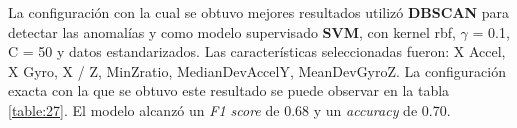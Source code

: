 	La configuración con la cual se obtuvo mejores resultados utilizó \textbf{DBSCAN} para detectar las anomalías y como modelo
	supervisado \textbf{SVM}, con kernel rbf, $\gamma$ = 0.1, C = 50  y datos estandarizados. Las características seleccionadas fueron: 
	X Accel, X Gyro,  X / Z, MinZratio, MedianDevAccelY, MeanDevGyroZ. La configuración exacta con la que se obtuvo este resultado se
	puede observar en la tabla \ref{table:27}. El modelo alcanzó un \emph{F1 score} de 0.68 y un \emph{accuracy} de 0.70.
